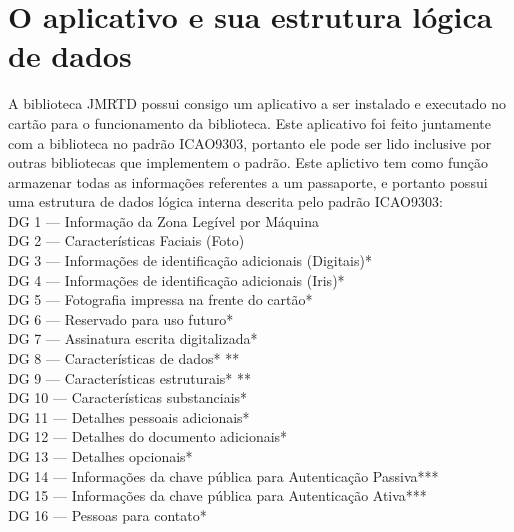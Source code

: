 \documentclass{article}
\begin{document}
	\section{O aplicativo e sua estrutura lógica de dados}
		\begin{justify}

			\hspace{2cm} A biblioteca JMRTD possui consigo um aplicativo a ser instalado e executado no cartão para o funcionamento da biblioteca\cite{SASSO}. Este aplicativo foi feito juntamente com a biblioteca no padrão ICAO9303, portanto ele pode ser lido inclusive por outras bibliotecas que implementem o padrão. Este aplictivo tem como função armazenar todas as informações referentes a um passaporte, e portanto possui uma estrutura de dados lógica interna descrita pelo padrão ICAO9303:\\
			
			\hspace*{1.5cm} DG 1 — Informação da Zona Legível por Máquina\\
			\hspace*{2cm} DG 2 — Características Faciais (Foto)\\
			\hspace*{2cm} DG 3 — Informações de identificação adicionais (Digitais)*\\
			\hspace*{2cm} DG 4 — Informações de identificação adicionais (Iris)*\\
			\hspace*{2cm} DG 5 — Fotografia impressa na frente do cartão*\\
			\hspace*{2cm} DG 6 — Reservado para uso futuro*\\
			\hspace*{2cm} DG 7 — Assinatura escrita digitalizada*\\
			\hspace*{2cm} DG 8 — Características de dados* **\\
			\hspace*{2cm} DG 9 — Características estruturais* **\\
			\hspace*{2cm} DG 10 — Características substanciais*\\
			\hspace*{2cm} DG 11 — Detalhes pessoais adicionais*\\
			\hspace*{2cm} DG 12 — Detalhes do documento adicionais*\\
			\hspace*{2cm} DG 13 — Detalhes opcionais*\\
			\hspace*{2cm} DG 14 — Informações da chave pública para Autenticação Passiva***\\
			\hspace*{2cm} DG 15 — Informações da chave pública para Autenticação Ativa***\\
			\hspace*{2cm} DG 16 — Pessoas para contato*\\


\end{justify}
\end{document}
